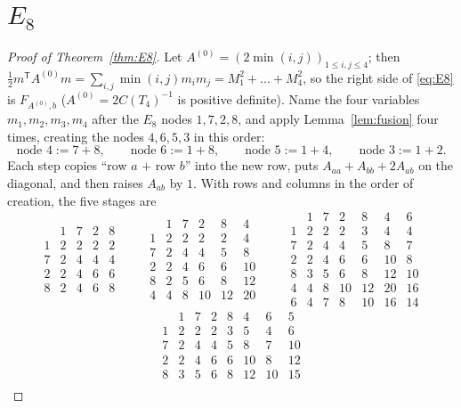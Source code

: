 \documentclass[11pt]{amsart}
\theoremstyle{definition}
\numberwithin{equation}{section}
\newcommand{\T}{\mathsf T}
\begin{document}
\section{\texorpdfstring{$E_8$}{E8}}\label{sec:E8}

\begin{proof}[Proof of Theorem~\ref{thm:E8}]
Let $A^{(0)}=(2\min(i,j))_{1\le i,j\le4}$; then $\frac12m^{\T}A^{(0)}m=\sum_{i,j}\min(i,j)m_im_j=M_1^2+\dots+M_4^2$,
so the right side of \eqref{eq:E8} is $F_{A^{(0)},b}$ ($A^{(0)}=2C(T_4)^{-1}$ is positive definite). Name the
four variables $m_1,m_2,m_3,m_4$ after the $E_8$ nodes $1,7,2,8$, and apply Lemma~\ref{lem:fusion} four
times, creating the nodes $4,6,5,3$ in this order:
\[
\text{node }4:=7+8,\qquad\text{node }6:=1+8,\qquad\text{node }5:=1+4,\qquad\text{node }3:=1+2 .
\]
Each step copies ``row $a$ + row $b$'' into the new row, puts $A_{aa}+A_{bb}+2A_{ab}$ on the diagonal, and
then raises $A_{ab}$ by $1$. With rows and columns in the order of creation, the five stages are
\[
\begin{array}{c|cccc}
&1&7&2&8\\\hline
1&2&2&2&2\\7&2&4&4&4\\2&2&4&6&6\\8&2&4&6&8
\end{array}
\qquad
\begin{array}{c|ccccc}
&1&7&2&8&4\\\hline
1&2&2&2&2&4\\7&2&4&4&5&8\\2&2&4&6&6&10\\8&2&5&6&8&12\\4&4&8&10&12&20
\end{array}
\qquad
\begin{array}{c|cccccc}
&1&7&2&8&4&6\\\hline
1&2&2&2&3&4&4\\7&2&4&4&5&8&7\\2&2&4&6&6&10&8\\8&3&5&6&8&12&10\\4&4&8&10&12&20&16\\6&4&7&8&10&16&14
\end{array}
\]
\[
\begin{array}{c|ccccccc}
&1&7&2&8&4&6&5\\\hline
1&2&2&2&3&5&4&6\\7&2&4&4&5&8&7&10\\2&2&4&6&6&10&8&12\\8&3&5&6&8&12&10&15\\

\end{array}\]
\end{proof}
\end{document}
